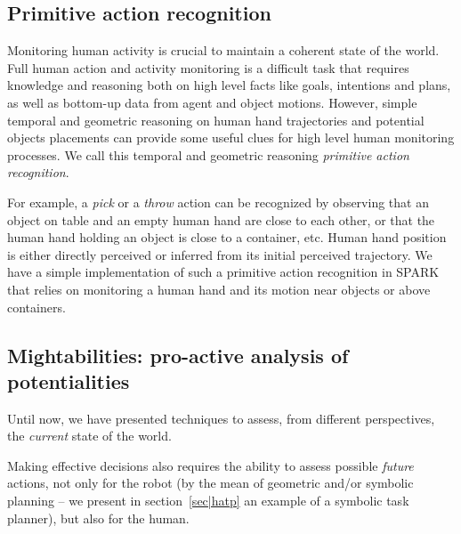 \documentclass{svmult}
\newcommand{\concept}[1]{{\footnotesize \texttt{#1}}}
\begin{document}

\subsection{Primitive action recognition}
\label{sec|primitives}

Monitoring human activity is crucial to maintain a coherent state of the world.
Full human action and activity monitoring is a difficult task that requires
knowledge and reasoning both on high level facts like goals, intentions and
plans, as well as bottom-up data from agent and object motions. However, simple
temporal and geometric reasoning on human hand trajectories and potential
objects placements can provide some useful clues for high level human
monitoring processes. We call this temporal and geometric reasoning
\emph{primitive action recognition}.

For example, a \emph{pick} or a \emph{throw} action can be
recognized by observing that an object on table and an empty human hand are
close to each other, or that the human hand holding an object is close to a
container, etc. Human hand position is either directly perceived or inferred
from its initial perceived trajectory.  We have a simple implementation of such
a primitive action recognition in SPARK that relies on monitoring a human hand
and its motion near objects or above containers.



\subsection{Mightabilities: pro-active analysis of potentialities}

Until now, we have presented techniques to assess, from different perspectives,
the \emph{current} state of the world.

Making effective decisions also requires the ability to assess possible \emph{future}
actions, not only for the robot (by the mean of geometric and/or symbolic planning --
we present in section~\ref{sec|hatp} an example of a symbolic task planner), but
also for the human.
\end{document}
